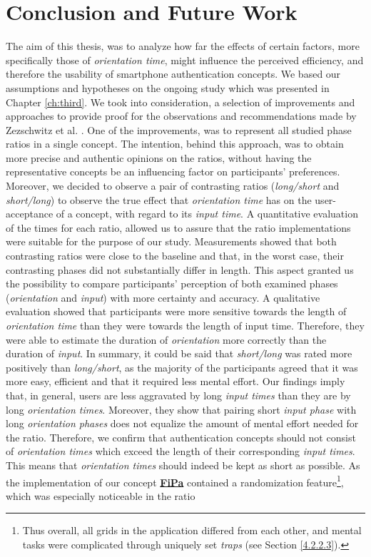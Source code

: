 
\chapter{Conclusion and Future Work}\label{ch:seventh}

The aim of this thesis, was to analyze how far the effects of certain factors, more specifically those of \textit{orientation time}, might influence the perceived efficiency, and therefore the usability of smartphone authentication concepts. We based our assumptions and hypotheses on the ongoing study which was presented in Chapter \ref{ch:third}. We took into consideration, a selection of improvements and approaches to provide proof for the observations and recommendations made by Zezschwitz et al. \cite{Zezschwitz}. One of the improvements, was to represent all studied phase ratios in a single concept. The intention, behind this approach, was to obtain more precise and authentic opinions on the ratios, without having the representative concepts be an influencing factor on participants' preferences. Moreover, we decided to observe a pair of contrasting ratios (\textit{long/short} and \textit{short/long}) to observe the true effect that \textit{orientation time} has on the user-acceptance of a concept, with regard to its \textit{input time}. A quantitative evaluation of the times for each ratio, allowed us to assure that the ratio implementations were suitable for the purpose of our study. Measurements showed that both contrasting ratios were close to the baseline and that, in the worst case, their contrasting phases did not substantially differ in length. This aspect granted us the possibility to compare participants' perception of both examined phases (\textit{orientation} and \textit{input}) with more certainty and accuracy. A qualitative evaluation showed that participants were more sensitive towards the length of \textit{orientation time} than they were towards the length of input time. Therefore, they were able to estimate the duration of \textit{orientation} more correctly than the duration of \textit{input}. In summary, it could be said that \textit{short/long} was rated more positively than \textit{long/short}, as the majority of the participants agreed that it was more easy, efficient and that it required less mental effort. Our findings imply that, in general, users are less aggravated by long \textit{input times} than they are by long \textit{orientation times}. Moreover, they show that pairing short \textit{input phase} with long \textit{orientation phases} does not equalize the amount of mental effort needed for the ratio. Therefore, we confirm that authentication concepts should not consist of \textit{orientation times} which exceed the length of their corresponding \textit{input times}. This means that \textit{orientation times} should indeed be kept as short as possible. As the implementation of our concept \underline{\textbf{FiPa}} contained a randomization feature\footnote{Thus overall, all grids in the application differed from each other, and mental tasks were complicated through uniquely set \textit{traps} (see Section \ref{4.2.2.3}).}, which was especially noticeable in the ratio 